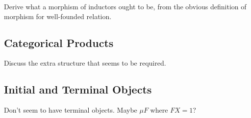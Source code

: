\documentclass{amsart}
\newcommand{\Set}{\mathsf{Set}}
\newcommand{\Cont}{\mathsf{Cont}}
\newcommand{\op}{\mathsf{op}}
\begin{document}
Derive what a morphism of inductors ought to be, from the obvious
definition of morphism for well-founded relation.

\subsection{Categorical Products}

Discuss the extra structure that seems to be required. 

\subsection{Initial and Terminal Objects}

Don't seem to have terminal objects. Maybe $\mu F$ where $FX = 1$?



\end{document}

